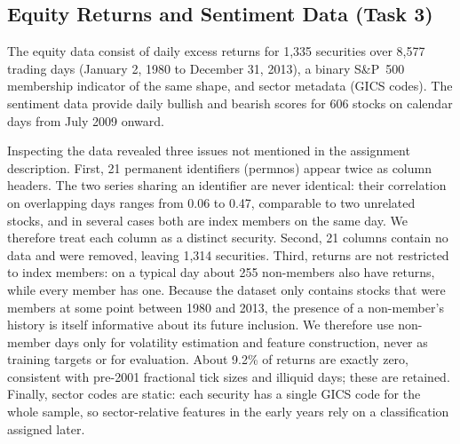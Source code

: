 %
%
%


\subsection{Equity Returns and Sentiment Data (Task 3)}
\label{sec:t3_data}

The equity data consist of daily excess returns for 1,335 securities over 8,577 trading days (January 2, 1980 to December 31, 2013), a binary S\&P~500 membership indicator of the same shape, and sector metadata (GICS codes). The sentiment data provide daily bullish and bearish scores for 606 stocks on calendar days from July 2009 onward.

Inspecting the data revealed three issues not mentioned in the assignment description. First, 21 permanent identifiers (permnos) appear twice as column headers. The two series sharing an identifier are never identical: their correlation on overlapping days ranges from 0.06 to 0.47, comparable to two unrelated stocks, and in several cases both are index members on the same day. We therefore treat each column as a distinct security. Second, 21 columns contain no data and were removed, leaving 1,314 securities. Third, returns are not restricted to index members: on a typical day about 255 non-members also have returns, while every member has one. Because the dataset only contains stocks that were members at some point between 1980 and 2013, the presence of a non-member's history is itself informative about its future inclusion. We therefore use non-member days only for volatility estimation and feature construction, never as training targets or for evaluation. About 9.2\% of returns are exactly zero, consistent with pre-2001 fractional tick sizes and illiquid days; these are retained. Finally, sector codes are static: each security has a single GICS code for the whole sample, so sector-relative features in the early years rely on a classification assigned later.

